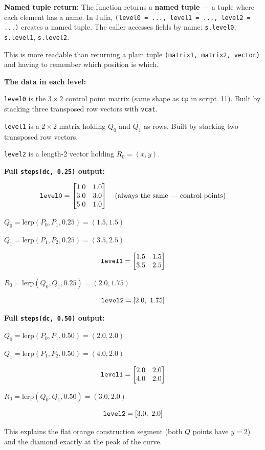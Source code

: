 \documentclass[12pt, a4paper]{article}
\newcommand{\cd}[1]{\texttt{#1}}
\begin{document}
\textbf{Named tuple return:}
The function returns a \textbf{named tuple} ---
a tuple where each element has a name.
In Julia, \cd{(level0 = ..., level1 = ..., level2 = ...)}
creates a named tuple.
The caller accesses fields by name:
\cd{s.level0}, \cd{s.level1}, \cd{s.level2}.

This is more readable than returning a plain tuple
\cd{(matrix1, matrix2, vector)} and having to remember
which position is which.

\textbf{The data in each level:}

\cd{level0} is the $3 \times 2$ control point matrix
(same shape as \cd{cp} in script~11).
Built by stacking three transposed row vectors with \cd{vcat}.

\cd{level1} is a $2 \times 2$ matrix holding $Q_0$ and
$Q_1$ as rows.
Built by stacking two transposed row vectors.

\cd{level2} is a length-2 vector holding $R_0 = (x, y)$.

\begin{examplebox}
\textbf{Full \cd{steps(dc, 0.25)} output:}

\[
  \text{\cd{level0}} =
  \begin{bmatrix} 1.0 & 1.0 \\ 3.0 & 3.0 \\ 5.0 & 1.0 \end{bmatrix}
  \quad \text{(always the same --- control points)}
\]

$Q_0 = \text{lerp}(P_0, P_1, 0.25) = (1.5, 1.5)$

$Q_1 = \text{lerp}(P_1, P_2, 0.25) = (3.5, 2.5)$

\[
  \text{\cd{level1}} =
  \begin{bmatrix} 1.5 & 1.5 \\ 3.5 & 2.5 \end{bmatrix}
\]

$R_0 = \text{lerp}(Q_0, Q_1, 0.25) = (2.0, 1.75)$

\[
  \text{\cd{level2}} = [2.0,\ 1.75]
\]
\end{examplebox}

\begin{examplebox}
\textbf{Full \cd{steps(dc, 0.50)} output:}

$Q_0 = \text{lerp}(P_0, P_1, 0.50) = (2.0, 2.0)$

$Q_1 = \text{lerp}(P_1, P_2, 0.50) = (4.0, 2.0)$

\[
  \text{\cd{level1}} =
  \begin{bmatrix} 2.0 & 2.0 \\ 4.0 & 2.0 \end{bmatrix}
\]

$R_0 = \text{lerp}(Q_0, Q_1, 0.50) = (3.0, 2.0)$

\[
  \text{\cd{level2}} = [3.0,\ 2.0]
\]

This explains the flat orange construction segment
(both $Q$ points have $y=2$) and the diamond exactly at
the peak of the curve.
\end{examplebox}
\end{document}
